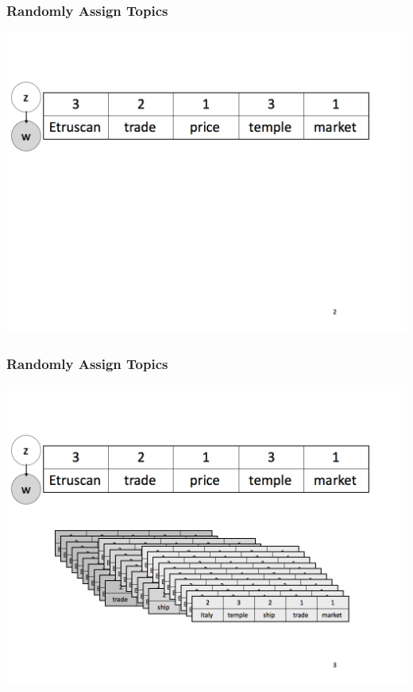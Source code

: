 \documentclass[xcolor=dvipsnames]{beamer}
\begin{document}
\begin{frame}
  \frametitle{Randomly Assign Topics}
    \includegraphics[width=\linewidth]{topic_models/mimno_002}
\end{frame}

\begin{frame}
  \frametitle{Randomly Assign Topics}
    \includegraphics[width=\linewidth]{topic_models/mimno_003}
\end{frame}
\end{document}
